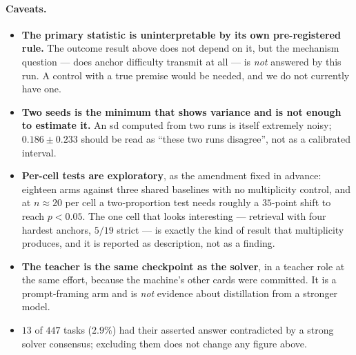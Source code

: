 \paragraph{Caveats.}
\begin{itemize}
\item \textbf{The primary statistic is uninterpretable by its own pre-registered rule.} The
outcome result above does not depend on it, but the mechanism question --- does anchor
difficulty transmit at all --- is \emph{not} answered by this run. A control with a true premise
would be needed, and we do not currently have one.
\item \textbf{Two seeds is the minimum that shows variance and is not enough to estimate it.}
An sd computed from two runs is itself extremely noisy; $0.186 \pm 0.233$ should be read as
``these two runs disagree'', not as a calibrated interval.
\item \textbf{Per-cell tests are exploratory}, as the amendment fixed in advance: eighteen arms
against three shared baselines with no multiplicity control, and at $n \approx 20$ per cell a
two-proportion test needs roughly a $35$-point shift to reach $p<0.05$. The one cell that looks
interesting --- retrieval with four hardest anchors, $5/19$ strict --- is exactly the kind of
result that multiplicity produces, and it is reported as description, not as a finding.
\item \textbf{The teacher is the same checkpoint as the solver}, in a teacher role at the same
effort, because the machine's other cards were committed. It is a prompt-framing arm and is
\emph{not} evidence about distillation from a stronger model.
\item $13$ of $447$ tasks ($2.9\%$) had their asserted answer contradicted by a strong solver
consensus; excluding them does not change any figure above.
\end{itemize}
